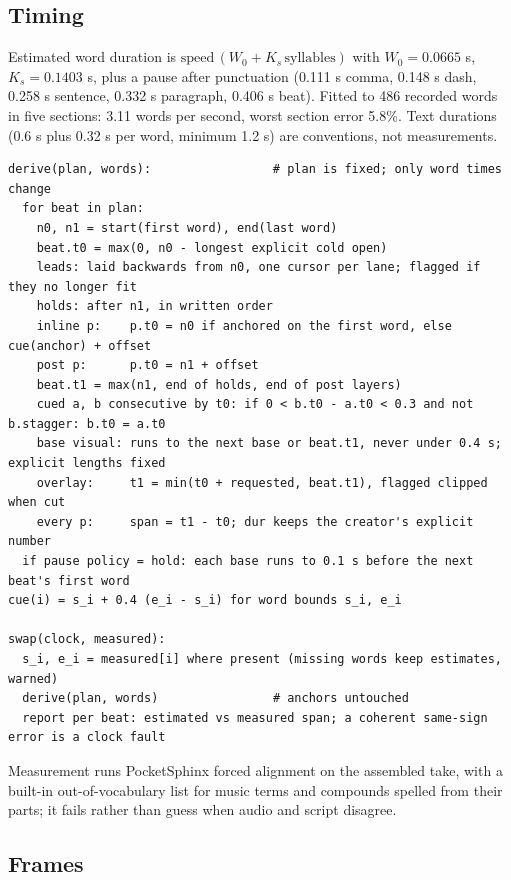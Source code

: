 \documentclass{ceurart}
\begin{document}
\subsection{Timing}\label{timing}

Estimated word duration is
\(\mathrm{speed}\,(W_0 + K_s\,\mathrm{syllables})\) with
\(W_0 = 0.0665\) s, \(K_s = 0.1403\) s, plus a pause after punctuation
(0.111 s comma, 0.148 s dash, 0.258 s sentence, 0.332 s paragraph, 0.406
s beat). Fitted to 486 recorded words in five sections: 3.11 words per
second, worst section error 5.8\%. Text durations (0.6 s plus 0.32 s per
word, minimum 1.2 s) are conventions, not measurements.

\begingroup\small\begin{verbatim}
derive(plan, words):                 # plan is fixed; only word times change
  for beat in plan:
    n0, n1 = start(first word), end(last word)
    beat.t0 = max(0, n0 - longest explicit cold open)
    leads: laid backwards from n0, one cursor per lane; flagged if they no longer fit
    holds: after n1, in written order
    inline p:    p.t0 = n0 if anchored on the first word, else cue(anchor) + offset
    post p:      p.t0 = n1 + offset
    beat.t1 = max(n1, end of holds, end of post layers)
    cued a, b consecutive by t0: if 0 < b.t0 - a.t0 < 0.3 and not b.stagger: b.t0 = a.t0
    base visual: runs to the next base or beat.t1, never under 0.4 s; explicit lengths fixed
    overlay:     t1 = min(t0 + requested, beat.t1), flagged clipped when cut
    every p:     span = t1 - t0; dur keeps the creator's explicit number
  if pause policy = hold: each base runs to 0.1 s before the next beat's first word
cue(i) = s_i + 0.4 (e_i - s_i) for word bounds s_i, e_i

swap(clock, measured):
  s_i, e_i = measured[i] where present (missing words keep estimates, warned)
  derive(plan, words)                # anchors untouched
  report per beat: estimated vs measured span; a coherent same-sign error is a clock fault
\end{verbatim}\endgroup

Measurement runs PocketSphinx forced alignment on the assembled take,
with a built-in out-of-vocabulary list for music terms and compounds
spelled from their parts; it fails rather than guess when audio and
script disagree.

\subsection{Frames}\label{frames}
\end{document}
